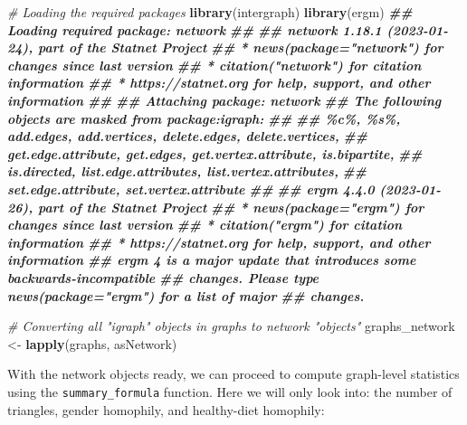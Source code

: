 \documentclass[
]{book}
\newenvironment{Shaded}{\begin{snugshade}}{\end{snugshade}}
\newcommand{\CommentTok}[1]{\textcolor[rgb]{0.56,0.35,0.01}{\textit{#1}}}
\newcommand{\DocumentationTok}[1]{\textcolor[rgb]{0.56,0.35,0.01}{\textbf{\textit{#1}}}}
\newcommand{\FunctionTok}[1]{\textcolor[rgb]{0.13,0.29,0.53}{\textbf{#1}}}
\newcommand{\NormalTok}[1]{#1}
\newcommand{\OtherTok}[1]{\textcolor[rgb]{0.56,0.35,0.01}{#1}}
\begin{document}
\begin{Shaded}
\begin{Highlighting}[]
\CommentTok{\# Loading the required packages}
\FunctionTok{library}\NormalTok{(intergraph)}
\FunctionTok{library}\NormalTok{(ergm)}
\DocumentationTok{\#\# Loading required package: network}
\DocumentationTok{\#\# }
\DocumentationTok{\#\# \textquotesingle{}network\textquotesingle{} 1.18.1 (2023{-}01{-}24), part of the Statnet Project}
\DocumentationTok{\#\# * \textquotesingle{}news(package="network")\textquotesingle{} for changes since last version}
\DocumentationTok{\#\# * \textquotesingle{}citation("network")\textquotesingle{} for citation information}
\DocumentationTok{\#\# * \textquotesingle{}https://statnet.org\textquotesingle{} for help, support, and other information}
\DocumentationTok{\#\# }
\DocumentationTok{\#\# Attaching package: \textquotesingle{}network\textquotesingle{}}
\DocumentationTok{\#\# The following objects are masked from \textquotesingle{}package:igraph\textquotesingle{}:}
\DocumentationTok{\#\# }
\DocumentationTok{\#\#     \%c\%, \%s\%, add.edges, add.vertices, delete.edges, delete.vertices,}
\DocumentationTok{\#\#     get.edge.attribute, get.edges, get.vertex.attribute, is.bipartite,}
\DocumentationTok{\#\#     is.directed, list.edge.attributes, list.vertex.attributes,}
\DocumentationTok{\#\#     set.edge.attribute, set.vertex.attribute}
\DocumentationTok{\#\# }
\DocumentationTok{\#\# \textquotesingle{}ergm\textquotesingle{} 4.4.0 (2023{-}01{-}26), part of the Statnet Project}
\DocumentationTok{\#\# * \textquotesingle{}news(package="ergm")\textquotesingle{} for changes since last version}
\DocumentationTok{\#\# * \textquotesingle{}citation("ergm")\textquotesingle{} for citation information}
\DocumentationTok{\#\# * \textquotesingle{}https://statnet.org\textquotesingle{} for help, support, and other information}
\DocumentationTok{\#\# \textquotesingle{}ergm\textquotesingle{} 4 is a major update that introduces some backwards{-}incompatible}
\DocumentationTok{\#\# changes. Please type \textquotesingle{}news(package="ergm")\textquotesingle{} for a list of major}
\DocumentationTok{\#\# changes.}

\CommentTok{\# Converting all "igraph" objects in graphs to network "objects"}
\NormalTok{graphs\_network }\OtherTok{\textless{}{-}} \FunctionTok{lapply}\NormalTok{(graphs, asNetwork)}
\end{Highlighting}
\end{Shaded}

With the network objects ready, we can proceed to compute graph-level statistics using the \texttt{summary\_formula} function. Here we will only look into: the number of triangles, gender homophily, and healthy-diet homophily:
\end{document}

